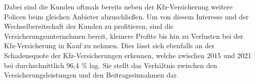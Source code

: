 Dabei sind die Kunden oftmals bereits neben der Kfz-Versicherung weitere Policen beim gleichen Anbieter abzuschließen. Um von diesem Interesse und der Wechselbereitschaft der Kunden zu profitieren, sind die Versicherungsunternehmen bereit, kleinere Profite bis hin zu Verlusten bei der Kfz-Versicherung in Kauf zu nehmen.\autocite[Vgl.][]{HARTUNG2019} Dies lässt sich ebenfalls an der Schadensquote der Kfz-Versicherungen erkennen, welche zwischen 2015 und 2021 bei durchschnittlich 96,4 \% lag. Sie stellt das Verhältnis zwischen den Versicherungsleistungen und den Beitragseinnahmen dar.\autocite[Vgl.][]{GDVKFZ}  



\newpage
